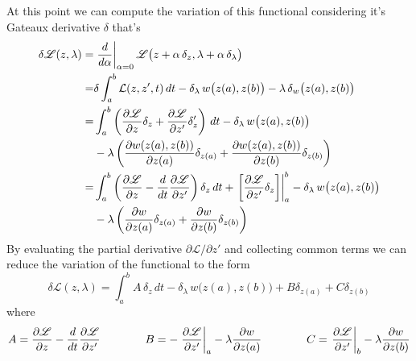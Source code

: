 	At this point we can compute the variation of this functional considering it's Gateaux derivative $\delta$ that's
	\begin{align*}
		\delta \mathscr L(z,\lambda)  =& \left.\frac{d}{d\alpha}\right|_{\alpha = 0} \mathscr L\big(z + \alpha\, \delta_z, \lambda + \alpha\, \delta_\lambda\big) \\
		=& \delta \int_a^b \mathcal L(z,z',t)\, dt - \delta_\lambda\,w\big(z(a),z(b)\big) - \lambda \, \delta_w\big(z(a),z(b)\big) \\
		=& \int_a^b \left( \frac{\partial \mathscr L}{\partial z}\delta_z + \frac{\partial \mathscr L}{\partial z'} \delta_z' \right) \, dt - \delta_\lambda\,w\big(z(a),z(b)\big)  \\ & - \lambda \left( \frac{\partial w(z(a),z(b))}{\partial z(a)} \delta_{z(a)} + \frac{\partial w(z(a),z(b))}{\partial z(b)} \delta_{z(b)} \right) \\
		= & \int_a^b \left( \frac{\partial \mathscr L}{\partial z} - \frac{d}{dt} \frac{\partial \mathscr L}{\partial z'} \right)\delta_z\, dt + \left.\left[ \frac{\partial \mathscr L}{\partial z'}\delta_z \right]\right|_a^b - \delta_\lambda\,w\big(z(a),z(b)\big) \\ & - \lambda\left( \frac{\partial w}{\partial z(a)} \delta_{z(a)} + \frac{\partial w}{\partial z(b)} \delta_{z(b)}  \right)
	\end{align*}
	By evaluating the partial derivative $\partial \mathscr L/\partial z'$ and collecting common terms we can reduce the variation of the functional to the form
	\[ \delta \mathscr L(z,\lambda) = \int_a^b A\,\delta_z\, dt - \delta_\lambda\, w\big(z(a),z(b)\big) + B \delta_{z(a)} + C \delta_{z(b)} \]
	where
	\[ A = \frac{\partial \mathscr L}{\partial z} - \frac{d}{dt} \frac{\partial \mathscr L}{\partial z'} \qquad \qquad B = - \left.\frac{\partial \mathscr L}{\partial z'} \right|_a - \lambda \frac{\partial w}{\partial z(a)} \qquad \qquad C = \left.\frac{\partial \mathscr L}{\partial z'} \right|_b - \lambda \frac{\partial w}{\partial z(b)}    \]
	
